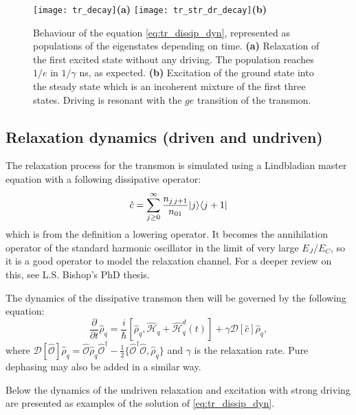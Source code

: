 \begin{figure}
\texttt{[image: tr\_decay]}\hspace{-7.5cm}\textbf{(a)}\hspace{6.5cm}
\texttt{[image: tr\_str\_dr\_decay]}\hspace{-7.5cm}\textbf{(b)}\hspace{6.5cm}
\caption{Behaviour of the equation \eqref{eq:tr_dissip_dyn}, represented as populations of the eigenstates depending on time. \textbf{(a)} Relaxation of the first excited state without any driving. The population reaches $1/e$ in $1/\gamma$ ns, as expected. \textbf{(b)} Excitation of the ground state into the steady state which is an incoherent mixture of the first three states. Driving is resonant with the $ge$ transition of the transmon.}
\end{figure}

\subsection{Relaxation dynamics (driven and undriven)}

The relaxation process for the transmon is simulated using a Lindbladian master equation with a following dissipative operator:
\begin{equation}
\hat c = \sum_{j\geq 0}^\infty \frac{n_{j\,j+1} }{n_{01}}\lvert j\rangle\langle j+1\rvert
\end{equation}
which is from the definition a lowering operator. It becomes the annihilation operator of the standard harmonic oscillator in the limit of very large $E_J/E_C$, so it is a good operator to model the relaxation channel. For a deeper review on this, see L.S. Bishop's PhD thesis.\cite{Bishop2010}

The dynamics of the dissipative transmon then will be governed by the following equation:
\begin{equation}
\frac{\partial}{\partial t} \hat{\rho}_q = \frac{i}{\hbar}[\hat{\rho}_q, \hat{\mathcal{H}}_q+\hat{\mathcal{H}}_q^d(t)] + \gamma \mathcal{D}[\hat c]\hat\rho_q,
\label{eq:tr_dissip_dyn}
\end{equation}
where $ \mathcal{D}[\hat{\mathcal{O}}]\hat\rho_q = \hat{\mathcal{O}} \hat\rho_q \hat{\mathcal{O}}^\dag - \frac{1}{2}\{\hat{\mathcal{O}}^\dag \hat{\mathcal{O}}, \hat\rho_q \}$ and $\gamma$ is the relaxation rate. Pure dephasing may also be added in a similar way.

Below the dynamics of the undriven relaxation and excitation with strong driving are presented as examples of the solution of \eqref{eq:tr_dissip_dyn}.

